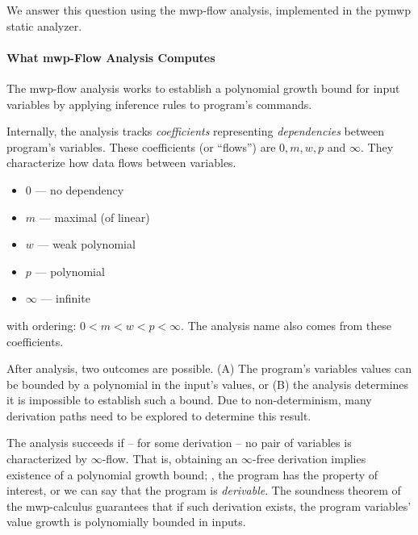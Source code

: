 We answer this question using the mwp-flow analysis, implemented in the pymwp static analyzer.

\paragraph*{What mwp-Flow Analysis Computes}

The mwp-flow analysis works to establish a polynomial growth bound for input variables by applying inference rules to program's commands.

Internally, the analysis tracks \emph{coefficients} representing \emph{dependencies} between program's variables.
These coefficients (or \enquote{flows}) are \(0, m, w, p\) and \(\infty\).
They characterize how data flows between variables.

\begin{itemize}
\item \(0\) --- no dependency
\item \(m\) --- maximal (of linear)
\item \(w\) --- weak polynomial
\item \(p\) --- polynomial
\item \(\infty\) --- infinite
\end{itemize}

with ordering: \(0 < m < w < p < \infty\).
The analysis name also comes from these coefficients.

After analysis, two outcomes are possible.
(A) The program's variables values can be bounded by a polynomial in the input's values, or (B) the analysis determines it is impossible to establish such a bound.
Due to non-determinism, many derivation paths need to be explored to determine this result.

The analysis succeeds if -- for some derivation -- no pair of variables is characterized by \(\infty\)-flow.
That is, obtaining an \(\infty\)-free derivation implies existence of a polynomial growth bound;
\ie, the program has the property of interest, or we can say that the program is \emph{derivable}.
The soundness theorem of the mwp-calculus guarantees that if such derivation exists, the program variables' value growth is polynomially bounded in inputs.

